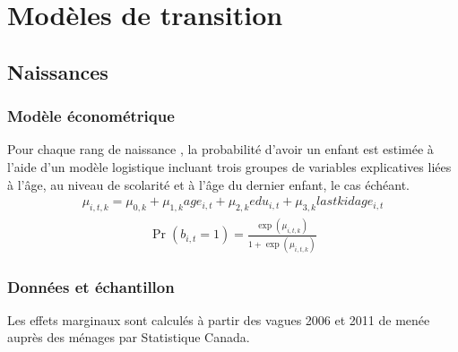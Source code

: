 \documentclass[letterpaper,10pt,french]{sphinxmanual}
\begin{document}
\chapter{Modèles de transition}
\label{\detokenize{transition_models:modeles-de-transition}}\label{\detokenize{transition_models:transition-models}}\label{\detokenize{transition_models::doc}}

\section{Naissances}
\label{\detokenize{transition_models:naissances}}

\subsection{Modèle économétrique}
\label{\detokenize{transition_models:modele-econometrique}}
Pour chaque rang de naissance , la probabilité d’avoir un enfant est estimée à l’aide d’un modèle logistique incluant trois groupes de variables explicatives liées à l’âge, au niveau de scolarité et à l’âge du dernier enfant, le cas échéant.
\begin{equation*}
\begin{split}\mu_{i,t,k} = \mu_{0,k} + \mu_{1,k} age_{i,t} + \mu_{2,k} edu_{i,t} + \mu_{3,k} lastkidage_{i,t}\end{split}
\end{equation*}\begin{equation*}
\begin{split}\Pr(b_{i,t}=1) = \frac{\exp(\mu_{i,t,k})}{1+\exp(\mu_{i,t,k})}\end{split}
\end{equation*}

\subsection{Données et échantillon}
\label{\detokenize{transition_models:donnees-et-echantillon}}
Les effets marginaux sont calculés à partir des vagues 2006 et 2011 de  menée auprès des ménages par Statistique Canada.
\end{document}
